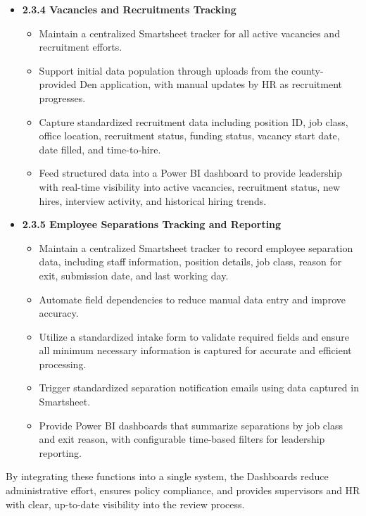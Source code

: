 \documentclass[12pt]{article}
\begin{document}
\begin{itemize}
    \item \textbf{2.3.4 Vacancies and Recruitments Tracking}
  \begin{itemize}
    \item Maintain a centralized Smartsheet tracker for all active vacancies and recruitment efforts.
    \item Support initial data population through uploads from the county-provided Den application, with manual updates by HR as recruitment progresses.
    \item Capture standardized recruitment data including position ID, job class, office location, recruitment status, funding status, vacancy start date, date filled, and time-to-hire.
    \item Feed structured data into a Power BI dashboard to provide leadership with real-time visibility into active vacancies, recruitment status, new hires, interview activity, and historical hiring trends.
  \end{itemize}

  \item \textbf{2.3.5 Employee Separations Tracking and Reporting}
  \begin{itemize}
    \item Maintain a centralized Smartsheet tracker to record employee separation data, including staff information, position details, job class, reason for exit, submission date, and last working day.
    \item Automate field dependencies to reduce manual data entry and improve accuracy.
    \item Utilize a standardized intake form to validate required fields and ensure all minimum necessary information is captured for accurate and efficient processing.
    \item Trigger standardized separation notification emails using data captured in Smartsheet.
    \item Provide Power BI dashboards that summarize separations by job class and exit reason, with configurable time-based filters for leadership reporting.
  \end{itemize}
\end{itemize}

By integrating these functions into a single system, the Dashboards reduce administrative effort, ensures policy compliance, and provides supervisors and HR with clear, up-to-date visibility into the review process.
\end{document}
